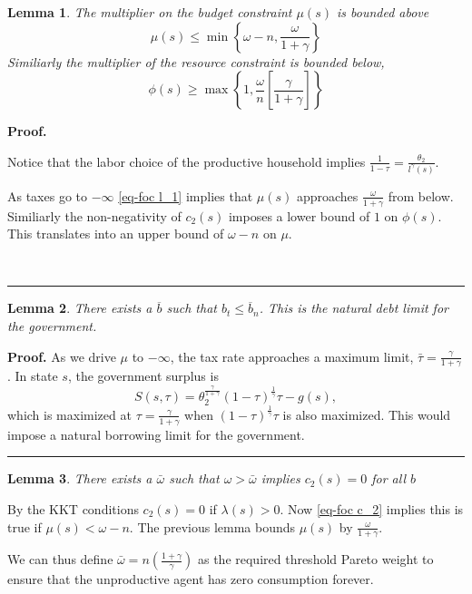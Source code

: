 \documentclass[thmsb,11pt]{article}
\newtheorem{lemma}{Lemma}
\newenvironment{proof}[1][Proof]{\noindent \textbf{#1.} }{\  \rule{0.5em}{0.5em}}
\begin{document}
\begin{lemma} The multiplier on the budget constraint $\mu(s)$ is bounded above
\[\mu(s)\leq \min \left\{\omega-n,\frac{\omega}{1+\gamma}\right\}\]
Similiarly the multiplier of the resource constraint is bounded below,
\[\phi(s)\geq \max \left\{1,\frac{\omega}{n}\left[\frac{\gamma}{1+\gamma}\right]\right\}  \]

\end{lemma}
\begin{proof}

Notice that the labor choice of the productive household implies $\frac{1}{1-\tau}=\frac{\theta_2}{l^{\gamma}(s)}$. 

As taxes go to $-\infty$ \eqref{eq-foc l_1} implies that $\mu(s)$ approaches $\frac{\omega}{1+\gamma}$ from below. Similiarly the non-negativity of $c_2(s)$ imposes a lower bound of $1$ on $\phi(s)$. This translates into an upper bound of $\omega-n$ on $\mu$. 
 
\end{proof}


\begin{lemma}
There exists  a $\overline{b}$ such that $b_t\leq\overline{b}_n$. This is the natural debt limit for the government.
\end{lemma}
\begin{proof}
As we drive $\mu$ to $-\infty$, the tax rate approaches a maximum limit, $\bar{\tau}=\frac{\gamma}{1+\gamma}$. In state $s$, the government surplus is
\[
	S(s,\tau) = \theta_2^\frac\gamma{1+\gamma}(1-\tau)^\frac1\gamma\tau - g(s),
\]  which  is  maximized at $\tau = \frac\gamma{1+\gamma}$ when $(1-\tau)^\frac1\gamma\tau$ is also maximized. This would impose a natural borrowing limit for the government. 
\end{proof}


\begin{lemma} 
There exists a $\bar{\omega}$ such that $\omega>\bar{\omega}$ implies $c_2(s)=0$ for all $b$
\end{lemma}
By the KKT conditions $c_2(s)=0$ if $\lambda(s)>0$. Now \eqref{eq-foc c_2} implies this is true if $\mu(s)<\omega-n$.  The previous lemma bounds $\mu(s)$ by $\frac{\omega}{1+\gamma}$. 

We can thus define $\bar{\omega} = n \left(\frac{1+\gamma}{\gamma}\right)$ as the required threshold Pareto weight to ensure that the unproductive agent has zero consumption forever.
\end{document}

